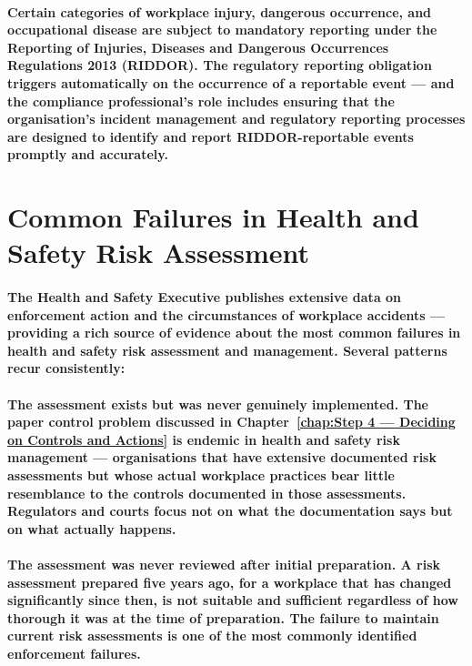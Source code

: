 \paragraph{Certain categories of workplace injury, dangerous occurrence, and occupational disease are subject to mandatory reporting under the Reporting of Injuries, Diseases and Dangerous Occurrences Regulations 2013 (RIDDOR). The regulatory reporting obligation triggers automatically on the occurrence of a reportable event — and the compliance professional's role includes ensuring that the organisation's incident management and regulatory reporting processes are designed to identify and report RIDDOR-reportable events promptly and accurately.}

\section{Common Failures in Health and Safety Risk Assessment}
\paragraph{The Health and Safety Executive publishes extensive data on enforcement action and the circumstances of workplace accidents — providing a rich source of evidence about the most common failures in health and safety risk assessment and management. Several patterns recur consistently:}
\paragraph{\textbf{The assessment exists but was never genuinely implemented}. The paper control problem discussed in Chapter~\ref{chap:Step 4 — Deciding on Controls and Actions} is endemic in health and safety risk management — organisations that have extensive documented risk assessments but whose actual workplace practices bear little resemblance to the controls documented in those assessments. Regulators and courts focus not on what the documentation says but on what actually happens.}
\paragraph{\textbf{The assessment was never reviewed after initial preparation}. A risk assessment prepared five years ago, for a workplace that has changed significantly since then, is not suitable and sufficient regardless of how thorough it was at the time of preparation. The failure to maintain current risk assessments is one of the most commonly identified enforcement failures.}
